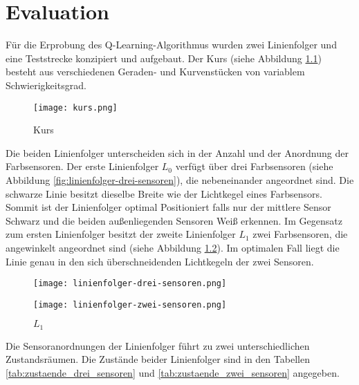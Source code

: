 \chapter{Evaluation} %
\label{cha:evaluation}

Für die Erprobung des Q-Learning-Algorithmus wurden zwei Linienfolger und eine Teststrecke konzipiert und aufgebaut. Der Kurs (siehe Abbildung \ref{fig:kurs}) besteht aus verschiedenen Geraden- und Kurvenstücken von variablem Schwierigkeitsgrad.

\begin{figure}[!htb]
	\centering
	\texttt{[image: kurs.png]}
	\caption{Kurs}
	\label{fig:kurs}
\end{figure}

Die beiden Linienfolger unterscheiden sich in der Anzahl und der Anordnung der Farbsensoren. Der erste Linienfolger $L_0$ verfügt über drei Farbsensoren (siehe Abbildung \ref{fig:linienfolger-drei-sensoren}), die nebeneinander angeordnet sind. Die schwarze Linie besitzt dieselbe Breite wie der Lichtkegel eines Farbsensors. Sommit ist der Linienfolger optimal Positioniert falls nur der mittlere Sensor Schwarz und die beiden außenliegenden Sensoren Weiß erkennen. Im Gegensatz zum ersten Linienfolger besitzt der zweite Linienfolger $L_1$ zwei Farbsensoren, die angewinkelt angeordnet sind (siehe Abbildung \ref{fig:linienfolger-zwei-sensoren}). Im optimalen Fall liegt die Linie genau in den sich überschneidenden Lichtkegeln der zwei Sensoren.

\begin{figure}[H]
    \centering
    \begin{minipage}{0.45\textwidth}
        \centering
        \texttt{[image: linienfolger-drei-sensoren.png]}
        \caption{$L_0$}
        \label{fig:linienfolger-drei-sensoren}
    \end{minipage}\hfill
    \begin{minipage}{0.45\textwidth}
        \centering
        \texttt{[image: linienfolger-zwei-sensoren.png]}
        \caption{$L_1$}
        \label{fig:linienfolger-zwei-sensoren}
    \end{minipage}
\end{figure}

Die Sensoranordnungen der Linienfolger führt zu zwei unterschiedlichen Zustandsräumen. Die Zustände beider Linienfolger sind in den Tabellen \ref{tab:zustaende_drei_sensoren} und \ref{tab:zustaende_zwei_sensoren} angegeben.

